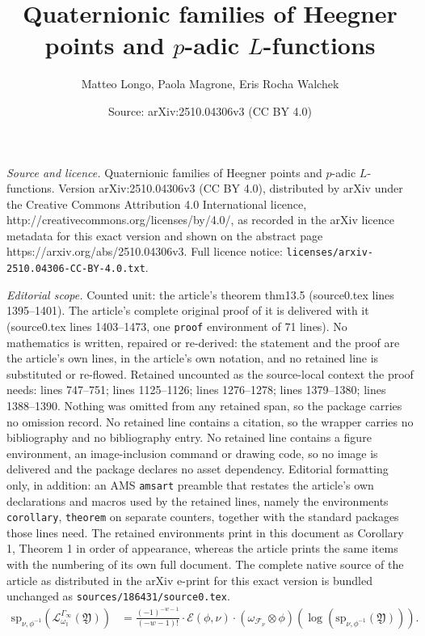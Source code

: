 \documentclass[10pt,a4paper]{amsart}
\title{Quaternionic families of Heegner points and $p$-adic $L$-functions}
\author{Matteo Longo, Paola Magrone, Eris Rocha Walchek}
\date{Source: arXiv:2510.04306v3 (CC BY 4.0)}
\newcommand{\I}{\mathbb{I}}
\begin{document}
\maketitle

\noindent\emph{Source and licence.} Quaternionic families of Heegner points and $p$-adic $L$-functions. Version arXiv:2510.04306v3 (CC BY 4.0), distributed by arXiv under the Creative Commons Attribution 4.0 International licence, http://creativecommons.org/licenses/by/4.0/, as recorded in the arXiv licence metadata for this exact version and shown on the abstract page https://arxiv.org/abs/2510.04306v3. Full licence notice: \texttt{licenses/arxiv-2510.04306-CC-BY-4.0.txt}.\par\smallskip

\noindent\textit{Editorial scope.} Counted unit: the article's theorem thm13.5 (source0.tex lines 1395--1401). The article's complete original proof of it is delivered with it (source0.tex lines 1403--1473, one \texttt{proof} environment of 71 lines). No mathematics is written, repaired or re-derived: the statement and the proof are the article's own lines, in the article's own notation, and no retained line is substituted or re-flowed.  Retained uncounted as the source-local context the proof needs: lines 747--751; lines 1125--1126; lines 1276--1278; lines 1379--1380; lines 1388--1390.  Nothing was omitted from any retained span, so the package carries no omission record.  No retained line contains a citation, so the wrapper carries no bibliography and no bibliography entry.  No retained line contains a figure environment, an image-inclusion command or drawing code, so no image is delivered and the package declares no asset dependency.  Editorial formatting only, in addition: an AMS \texttt{amsart} preamble that restates the article's own declarations and macros used by the retained lines, namely the environments \texttt{corollary}, \texttt{theorem} on separate counters, together with the standard packages those lines need.  The retained environments print in this document as Corollary 1, Theorem 1 in order of appearance, whereas the article prints the same items with the numbering of its own full document.  The complete native source of the article as distributed in the arXiv e-print for this exact version is bundled unchanged as \texttt{sources/186431/source0.tex}.
\begin{equation}\label{prop12.2}
\begin{split}
\mathrm{sp}_{\nu,\phi^{-1}}\left(\mathcal{L}_{\omega_{\I}}^{\Gamma_\infty}(\mathfrak{Y})\right)&=\frac{(-1)^{-w-1}}{(-w-1)!}\cdot \mathcal{E}(\phi,\nu)\cdot
({\omega}_{\mathcal{F}_\nu}\otimes\phi)\left(\log(\mathrm{sp}_{\nu,\phi^{-1}}(\mathfrak{Y}))\right)
.\end{split}\end{equation}
\end{document}
